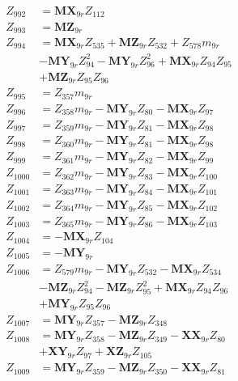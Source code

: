 \begin{multicols}{2}
\begin{align}
Z_{992} &= \mathbf{MX}_{9r}Z_{112} \nonumber \\
Z_{993} &= \mathbf{MZ}_{9r} \nonumber \\
Z_{994} &= \mathbf{MX}_{9r}Z_{535} + \mathbf{MZ}_{9r}Z_{532} + Z_{578}m_{9r}  \nonumber \\
&- \mathbf{MY}_{9r}Z_{94}^2 - \mathbf{MY}_{9r}Z_{96}^2 + \mathbf{MX}_{9r}Z_{94}Z_{95}  \nonumber \\
&+ \mathbf{MZ}_{9r}Z_{95}Z_{96} \nonumber \\
Z_{995} &= Z_{357}m_{9r} \nonumber \\
Z_{996} &= Z_{358}m_{9r} - \mathbf{MY}_{9r}Z_{80} - \mathbf{MX}_{9r}Z_{97} \nonumber \\
Z_{997} &= Z_{359}m_{9r} - \mathbf{MY}_{9r}Z_{81} - \mathbf{MX}_{9r}Z_{98} \nonumber \\
Z_{998} &= Z_{360}m_{9r} - \mathbf{MY}_{9r}Z_{81} - \mathbf{MX}_{9r}Z_{98} \nonumber \\
Z_{999} &= Z_{361}m_{9r} - \mathbf{MY}_{9r}Z_{82} - \mathbf{MX}_{9r}Z_{99} \nonumber \\
Z_{1000} &= Z_{362}m_{9r} - \mathbf{MY}_{9r}Z_{83} - \mathbf{MX}_{9r}Z_{100} \nonumber \\
Z_{1001} &= Z_{363}m_{9r} - \mathbf{MY}_{9r}Z_{84} - \mathbf{MX}_{9r}Z_{101} \nonumber \\
Z_{1002} &= Z_{364}m_{9r} - \mathbf{MY}_{9r}Z_{85} - \mathbf{MX}_{9r}Z_{102} \nonumber \\
Z_{1003} &= Z_{365}m_{9r} - \mathbf{MY}_{9r}Z_{86} - \mathbf{MX}_{9r}Z_{103} \nonumber \\
Z_{1004} &= -\mathbf{MX}_{9r}Z_{104} \nonumber \\
Z_{1005} &= -\mathbf{MY}_{9r} \nonumber \\
Z_{1006} &= Z_{579}m_{9r} - \mathbf{MY}_{9r}Z_{532} - \mathbf{MX}_{9r}Z_{534}  \nonumber \\
&- \mathbf{MZ}_{9r}Z_{94}^2 - \mathbf{MZ}_{9r}Z_{95}^2 + \mathbf{MX}_{9r}Z_{94}Z_{96}  \nonumber \\
&+ \mathbf{MY}_{9r}Z_{95}Z_{96} \nonumber \\
Z_{1007} &= \mathbf{MY}_{9r}Z_{357} - \mathbf{MZ}_{9r}Z_{348} \nonumber \\
Z_{1008} &= \mathbf{MY}_{9r}Z_{358} - \mathbf{MZ}_{9r}Z_{349} - \mathbf{XX}_{9r}Z_{80}  \nonumber \\
&+ \mathbf{XY}_{9r}Z_{97} + \mathbf{XZ}_{9r}Z_{105} \nonumber \\
Z_{1009} &= \mathbf{MY}_{9r}Z_{359} - \mathbf{MZ}_{9r}Z_{350} - \mathbf{XX}_{9r}Z_{81}  \nonumber \\

\end{align}
\end{multicols}
